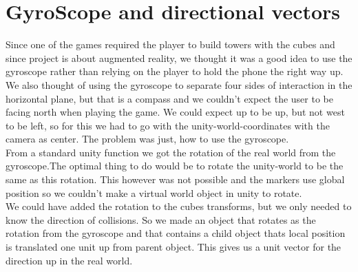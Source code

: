 \section{GyroScope and directional vectors}
Since one of the games required the player to build towers with the cubes and since project is about augmented reality, we thought it was a good idea to use the gyroscope rather than relying on the player to hold the phone the right way up. We also thought of using the gyroscope to separate four sides of interaction in the horizontal plane, but that is a compass and we couldn't expect the user to be facing north when playing the game. We could expect up to be up, but not west to be left, so for this we had to go with the unity-world-coordinates with the camera as center. The problem was just, how to use the gyroscope.\\
From a standard unity function we got the rotation of the real world from the gyroscope.The optimal thing to do would be to rotate the unity-world to be the same as this rotation. This however was not possible and the markers use global position so we couldn't make a virtual world object in unity to rotate.\\
We could have added the rotation to the cubes transforms, but we only needed to know the direction of collisions. So we made an object that rotates as the rotation from the gyroscope and that contains a child object thats local position is translated one unit up from parent object. This gives us a unit vector for the direction up in the real world.
\\
